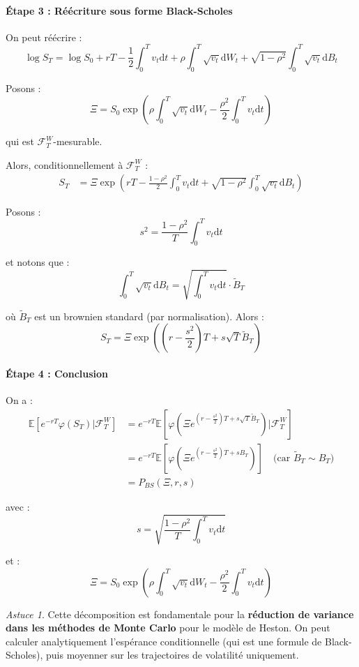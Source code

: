 \documentclass[12pt,a4paper]{article}
\theoremstyle{definition}
\theoremstyle{remark}
\newtheorem*{astuce}{Astuce}
\newcommand{\E}{\mathbb{E}}
\newcommand{\dd}{\mathrm{d}}
\begin{document}
\paragraph{Étape 3 : Réécriture sous forme Black-Scholes}

On peut réécrire :
\[
\log S_T = \log S_0 + rT - \frac{1}{2}\int_0^T v_t\dd t + \rho\int_0^T \sqrt{v_t}\dd W_t + \sqrt{1-\rho^2}\int_0^T \sqrt{v_t}\dd B_t
\]

Posons :
\[
\Xi = S_0 \exp\left(\rho\int_0^T \sqrt{v_t}\dd W_t - \frac{\rho^2}{2}\int_0^T v_t\dd t\right)
\]

qui est $\mathcal{F}_T^W$-mesurable.

Alors, conditionnellement à $\mathcal{F}_T^W$ :
\begin{align*}
S_T &= \Xi \exp\left(rT - \frac{1-\rho^2}{2}\int_0^T v_t\dd t + \sqrt{1-\rho^2}\int_0^T \sqrt{v_t}\dd B_t\right)
\end{align*}

Posons :
\[
s^2 = \frac{1-\rho^2}{T}\int_0^T v_t\dd t
\]

et notons que :
\[
\int_0^T \sqrt{v_t}\dd B_t = \sqrt{\int_0^T v_t\dd t} \cdot \tilde{B}_T
\]

où $\tilde{B}_T$ est un brownien standard (par normalisation). Alors :
\[
S_T = \Xi \exp\left(\left(r - \frac{s^2}{2}\right)T + s\sqrt{T}\tilde{B}_T\right)
\]

\paragraph{Étape 4 : Conclusion}

On a :
\begin{align*}
\E[e^{-rT}\varphi(S_T)|\mathcal{F}_T^W] &= e^{-rT}\E\left[\varphi\left(\Xi e^{(r-\frac{s^2}{2})T + s\sqrt{T}\tilde{B}_T}\right) \Big| \mathcal{F}_T^W\right] \\
&= e^{-rT}\E\left[\varphi\left(\Xi e^{(r-\frac{s^2}{2})T + sB_T}\right)\right] \quad \text{(car } \tilde{B}_T \sim B_T\text{)} \\
&= P_{BS}\left(\Xi, r, s\right)
\end{align*}

avec :
\[
s = \sqrt{\frac{1-\rho^2}{T}\int_0^T v_t\dd t}
\]

et :
\[
\boxed{\Xi = S_0 \exp\left(\rho\int_0^T \sqrt{v_t}\dd W_t - \frac{\rho^2}{2}\int_0^T v_t\dd t\right)}
\]

\begin{astuce}
Cette décomposition est fondamentale pour la \textbf{réduction de variance dans les méthodes de Monte Carlo} pour le modèle de Heston. On peut calculer analytiquement l'espérance conditionnelle (qui est une formule de Black-Scholes), puis moyenner sur les trajectoires de volatilité uniquement.
\end{astuce}
\end{document}
